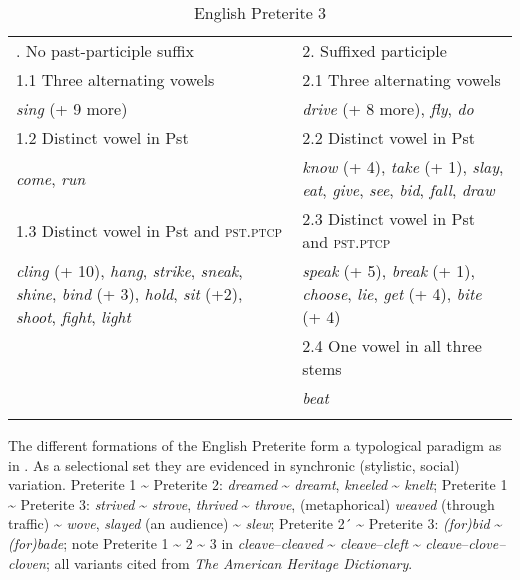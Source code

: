 \documentclass[output=paper, colorlinks,citecolor=brown]{langsci/langscibook}
\begin{document}
\begin{table}
\caption{English Preterite 3}
\label{tab:andersen_11}
\begin{tabularx}{\textwidth}{QQ}
. No past-participle suffix & 2. Suffixed participle\\
1.1 Three alternating vowels & 2.1 Three alternating vowels\\
\textit{sing} (+ 9 more) & \textit{drive} (+ 8 more), \textit{fly}, \textit{do}\\
1.2 Distinct vowel in Pst & 2.2 Distinct vowel in Pst\\
\textit{come}, \textit{run} & \textit{know} (+ 4), \textit{take} (+ 1), \textit{slay}, \textit{eat}, \textit{give}, \textit{see}, \textit{bid}, \textit{fall}, \textit{draw}\\
1.3 Distinct vowel in Pst and \textsc{pst.ptcp} & 2.3 Distinct vowel in Pst and \textsc{pst.ptcp}\\
\textit{cling} (+ 10), \textit{hang}, \textit{strike}, \textit{sneak}, \textit{shine}, \textit{bind} (+ 3), \textit{hold}, \textit{sit} (+2), \textit{shoot}, \textit{fight}, \textit{light} & \textit{speak} (+ 5), \textit{break} (+ 1), \textit{choose}, \textit{lie}, \textit{get} (+ 4), \textit{bite} (+ 4)\\
& 2.4 One vowel in all three stems\\
& \textit{beat}\\
\lspbottomrule
\end{tabularx}
\end{table}


The different formations of the English Preterite form a typological paradigm as in . As a selectional set they are evidenced in synchronic (stylistic, social) variation.  Preterite 1 {\textasciitilde} Preterite 2: \textit{dreamed} {\textasciitilde} \textit{dreamt}, \textit{kneeled} {\textasciitilde} \textit{knelt}; Preterite 1 {\textasciitilde} Preterite 3: \textit{strived} {\textasciitilde} \textit{strove}, \textit{thrived} {\textasciitilde} \textit{throve}, (metaphorical) \textit{weaved} (through traffic) {\textasciitilde} \textit{wove}, \textit{slayed} (an audience) {\textasciitilde} \textit{slew}; Preterite 2´ {\textasciitilde} Preterite 3: \textit{(for)bid} {\textasciitilde} \textit{(for)bade}; note Preterite 1 {\textasciitilde} 2 {\textasciitilde} 3 in \textit{cleave}–\textit{cleaved} {\textasciitilde} \textit{cleave}–\textit{cleft} {\textasciitilde} \textit{cleave}–\textit{clove–cloven}; all variants cited from \textit{The American Heritage Dictionary}.\largerpage
 
\end{document}
